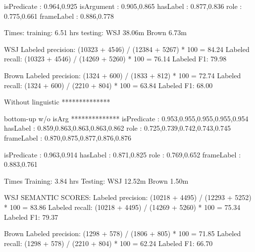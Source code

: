          isPredicate    : 0.964,0.925
          isArgument    : 0.905,0.865
            hasLabel    : 0.877,0.836
                role    : 0.775,0.661
          frameLabel    : 0.886,0.778

Times:
training: 6.51 hrs
testing:
 WSJ        38.06m
 Brown       6.73m 

WSJ     
  Labeled precision:          (10323 + 4546) / (12384 + 5267) * 100 = 84.24 %
  Labeled recall:             (10323 + 4546) / (14269 + 5260) * 100 = 76.14 %
  Labeled F1:                 79.98

Brown
  Labeled precision:          (1324 + 600) / (1833 + 812) * 100 = 72.74 %
  Labeled recall:             (1324 + 600) / (2210 + 804) * 100 = 63.84 %
  Labeled F1:                 68.00


Without linguistic
**************




bottom-up w/o isArg
**************
         isPredicate    : 0.953,0.955,0.955,0.955,0.954
            hasLabel    : 0.859,0.863,0.863,0.863,0.862
                role    : 0.725,0.739,0.742,0.743,0.745
          frameLabel    : 0.870,0.875,0.877,0.876,0.876

         isPredicate    : 0.963,0.914
            hasLabel    : 0.871,0.825
                role    : 0.769,0.652
          frameLabel    : 0.883,0.761

Times
Training: 3.84 hrs
Testing:
WSJ         12.52m
Brown        1.50m 

WSJ
  SEMANTIC SCORES:
  Labeled precision:          (10218 + 4495) / (12293 + 5252) * 100 = 83.86 %
  Labeled recall:             (10218 + 4495) / (14269 + 5260) * 100 = 75.34 %
  Labeled F1:                 79.37


Brown
  Labeled precision:          (1298 + 578) / (1806 + 805) * 100 = 71.85 %
  Labeled recall:             (1298 + 578) / (2210 + 804) * 100 = 62.24 %
  Labeled F1:                 66.70


